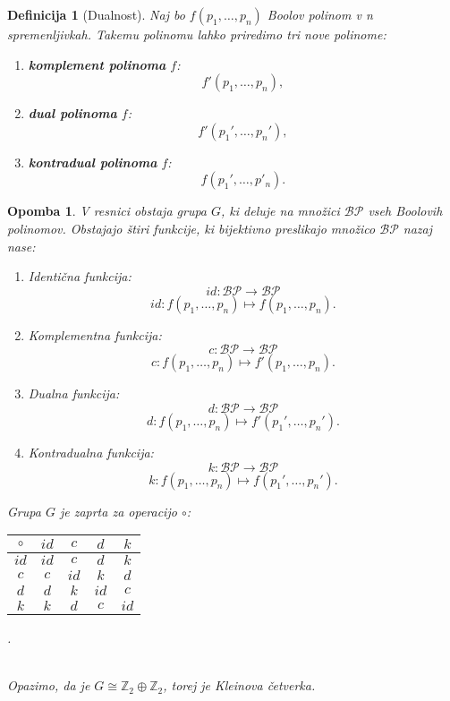 \documentclass{amsart}
\newcommand{\ZZ}{\mathbb{Z}}
\newtheorem{definicija}[izrek]{Definicija}
\newtheorem{opomba}[izrek]{Opomba}
\begin{document}
\begin{definicija}[Dualnost]
    Naj bo \(f(p_1, \ldots ,p_n)\) Boolov polinom v n spremenljivkah. Takemu polinomu lahko priredimo
    tri nove polinome:
    \begin{enumerate}
        \item {\bf komplement polinoma} \(f\):
            \[f'(p_1, \ldots ,p_n),\]
        \item {\bf dual polinoma} \(f\):
            \[f'(p_1', \ldots ,p_n'),\]
        \item {\bf kontradual polinoma} \(f\):
            \[f(p_1', \ldots ,p'_n).\]
    \end{enumerate}
\end{definicija}
\begin{opomba}
    V resnici obstaja grupa \(G\), ki deluje na množici \(\mathcal{BP}\) vseh Boolovih polinomov.
    Obstajajo štiri funkcije, ki bijektivno preslikajo množico \(\mathcal{BP}\) nazaj nase:
    \begin{enumerate}
        \item Identična funkcija:
        \[id: \mathcal{BP} \rightarrow \mathcal{BP}\]
        \[id: f(p_1, \ldots ,p_n) \mapsto f(p_1, \ldots ,p_n).\]
        \item Komplementna funkcija:
        \[c: \mathcal{BP} \rightarrow \mathcal{BP}\]
        \[c: f(p_1, \ldots ,p_n) \mapsto f'(p_1, \ldots ,p_n).\]
        \item Dualna funkcija:
        \[d: \mathcal{BP} \rightarrow \mathcal{BP}\]
        \[d: f(p_1, \ldots ,p_n) \mapsto f'(p_1', \ldots ,p_n').\]
        \item Kontradualna funkcija:
        \[k: \mathcal{BP} \rightarrow \mathcal{BP}\]
        \[k: f(p_1, \ldots ,p_n) \mapsto f(p_1', \ldots ,p_n').\]
    \end{enumerate}

    Grupa \(G\) je zaprta za operacijo \(\circ\):
    \begin{table*}[htp]
        \begin{tabular}{c|c|c|c|c|}
            \(\circ\) & $id$ & $c$ & $d$ & $k$ \\
            \hline
            $id$ & $id$ &$c$ & $d$ & $k$ \\
            \hline
            $c$ & $c$ & $id$ & $k$ & $d$ \\
            \hline
            $d$ & $d$ & $k$ & $id$ & $c$ \\
            \hline
            $k$ & $k$ & $d$ & $c$ & $id$ \\
            \hline
        \end{tabular}.
    \end{table*}\\
    Opazimo, da je \(G \cong \ZZ_2  \oplus \ZZ_2 \), torej je Kleinova četverka.
\end{opomba}
\end{document}
